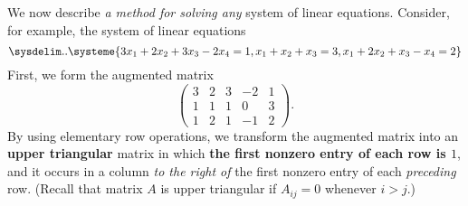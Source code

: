 \begin{remark} \label{remark 3.4.1}
We now describe \emph{a method for solving any} system of linear equations.
Consider, for example, the system of linear equations
\[
    \sysdelim..\systeme{
        3 x_1 + 2 x_2 + 3 x_3 - 2 x_4 = 1,
          x_1 +   x_2 +   x_3         = 3,
          x_1 + 2 x_2 +   x_3 -   x_4 = 2
    }
\]
First, we form the augmented matrix
\[
    \left(\begin{array}{rrrr|r}
        3 & 2 & 3 & -2 & 1 \\
        1 & 1 & 1 & 0 & 3 \\
        1 & 2 & 1 & -1 & 2
    \end{array}\right).
\]
By using elementary row operations, we transform the augmented matrix into an \textbf{upper triangular} matrix in which \textbf{the first nonzero entry of each row is \(1\)},
and it occurs in a column \emph{to the right of} the first nonzero entry of each \emph{preceding} row.
(Recall that matrix \(A\) is upper triangular if \(A_{ij} = 0\) whenever \(i > j\).)


\end{remark}
